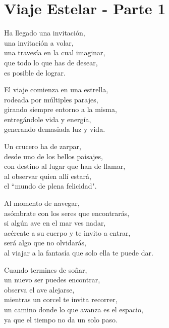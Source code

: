 \section*{Viaje Estelar - Parte 1}
\label{Viaje_estelar_p1}

\vspace{1em}
\begin{center}
Ha llegado una invitación,\\
una invitación a volar,\\
una travesía en la cual imaginar,\\
que todo lo que has de desear,\\
es posible de lograr.

\vspace{1em}
El viaje comienza en una estrella,\\
rodeada por múltiples parajes,\\
girando siempre entorno a la misma,\\
entregándole vida y energía,\\
generando demasiada luz y vida.

\vspace{1em}
Un crucero ha de zarpar,\\
desde uno de los bellos paisajes,\\
con destino al lugar que han de llamar,\\
al observar quien allí estará,\\
el ``mundo de plena felicidad".

\vspace{1em}
Al momento de navegar,\\
asómbrate con los seres que encontrarás,\\
si algún ave en el mar ves nadar,\\
acércate a su cuerpo y te invito a entrar,\\
será algo que no olvidarás,\\
al viajar a la fantasía que solo ella te puede dar.

\vspace{1em}
Cuando termines de soñar,\\
un nuevo ser puedes encontrar,\\
observa el ave alejarse,\\
mientras un corcel te invita recorrer,\\
un camino donde lo que avanza es el espacio,\\
ya que el tiempo no da un solo paso.


\end{center}
